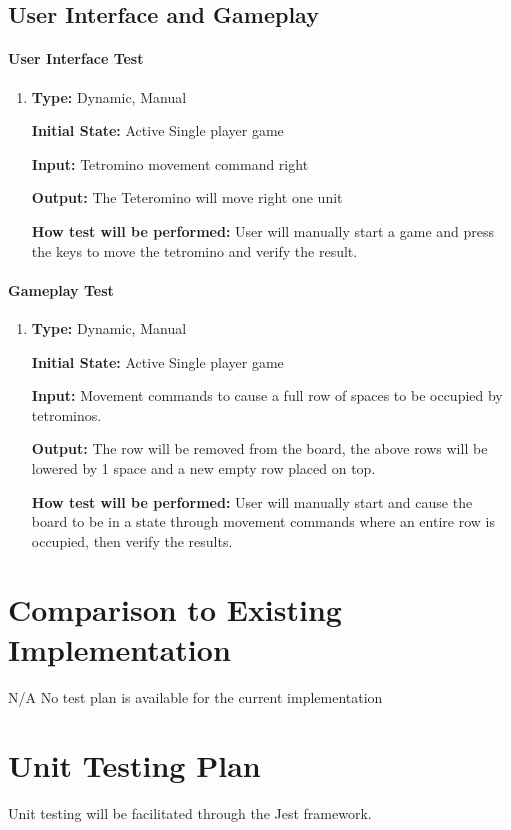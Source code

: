 \documentclass[12pt, titlepage]{article}
\begin{document}
	\subsection{User Interface and Gameplay}
	\paragraph{User Interface Test}
	\begin{enumerate}[{POC-}2. ]
		\item
		
		\textbf{Type:} Dynamic, Manual
		
		\textbf{Initial State:} Active Single player game
		
		\textbf{Input:} Tetromino movement command right
		
		\textbf{Output:} The Teteromino will move right one unit
		
		\textbf{How test will be performed:} User will manually start a game and press the keys to move the tetromino and verify the result.
	\end{enumerate}
	
	\paragraph{Gameplay Test}
	\begin{enumerate}[{POC-}3. ]
		\item
		
		\textbf{Type:} Dynamic, Manual
		
		\textbf{Initial State:} Active Single player game
		
		\textbf{Input:} Movement commands to cause a full row of spaces to be occupied by tetrominos.
		
		\textbf{Output:} The row will be removed from the board, the above rows will be lowered by 1 space and a new empty row placed on top.
		
		\textbf{How test will be performed:} User will manually start and cause the board to be in a state through movement commands where an entire row is occupied, then verify the results.
	\end{enumerate}
	
	
	
	\section{Comparison to Existing Implementation}	
	N/A No test plan is available for the current implementation				
	\section{Unit Testing Plan}
	Unit testing will be facilitated through the Jest framework.		
\end{document}
